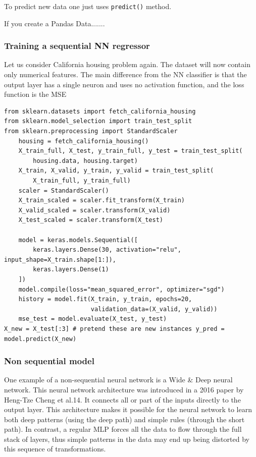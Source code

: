\documentclass[12pt, letterpaper]{article}
\theoremstyle{definition}
\begin{document}
To predict new data one just uses \lstinline+predict()+ method.

If you create a Pandas Data.......

\subsubsection{Training a sequential NN regressor}
Let us consider California housing problem again. The dataset will now contain only numerical features. The main difference from the NN classifier is that the output layer has a single neuron and uses no activation function, and the loss function is the MSE

\begin{lstlisting}
from sklearn.datasets import fetch_california_housing 
from sklearn.model_selection import train_test_split 
from sklearn.preprocessing import StandardScaler
    housing = fetch_california_housing()
    X_train_full, X_test, y_train_full, y_test = train_test_split(
        housing.data, housing.target)
    X_train, X_valid, y_train, y_valid = train_test_split(
        X_train_full, y_train_full)
    scaler = StandardScaler()
    X_train_scaled = scaler.fit_transform(X_train)
    X_valid_scaled = scaler.transform(X_valid)
    X_test_scaled = scaler.transform(X_test)
    
    model = keras.models.Sequential([
        keras.layers.Dense(30, activation="relu", input_shape=X_train.shape[1:]),
        keras.layers.Dense(1)
    ])
    model.compile(loss="mean_squared_error", optimizer="sgd")
    history = model.fit(X_train, y_train, epochs=20,
                        validation_data=(X_valid, y_valid))
    mse_test = model.evaluate(X_test, y_test)
X_new = X_test[:3] # pretend these are new instances y_pred = model.predict(X_new)
\end{lstlisting}

\subsubsection{Non sequential model}
One example of a non-sequential neural network is a Wide \& Deep neural network. This neural network architecture was introduced in a 2016 paper by Heng-Tze Cheng et al.14. It connects all or part of the inputs directly to the output layer. This architecture makes it possible for the neural network to learn both deep patterns (using the deep path) and simple rules (through the short path). In contrast, a regular MLP forces all the data to flow through the full stack of layers, thus simple patterns in the data may end up being distorted by this sequence of transformations.
\end{document}
